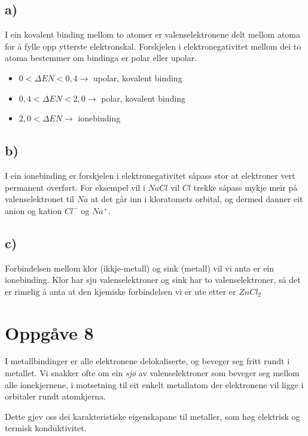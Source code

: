 \documentclass[12pt,a4paper]{article}
\begin{document}
    \subsection*{a)}
    I ein kovalent binding mellom to atomer er valenselektronene delt mellom
    atoma for å fylle opp ytterste elektronskal. Forskjelen i
    elektronegativitet mellom dei to atoma bestemmer om bindinga er polar eller
    upolar.
    \begin{itemize}
      \item $0 < \Delta EN < 0,4 \rightarrow$ upolar, kovalent binding
      \item $0,4 < \Delta EN < 2,0 \rightarrow$ polar, kovalent binding
      \item $2,0 < \Delta EN \rightarrow$ ionebinding
    \end{itemize}

    \subsection*{b)}
    I ein ionebinding er forskjelen i elektronegativitet såpass stor at
    elektroner vert permanent overført. For eksempel vil i $NaCl$ vil $Cl$
    trekke såpass mykje meir på valenselektronet til $Na$ at det går inn i
    kloratomets orbital, og dermed danner eit anion og kation $Cl^-$ og $Na^+$.

    \subsection*{c)}
    Forbindelsen mellom klor (ikkje-metall) og sink (metall) vil vi anta er ein ionebinding.
    Klor har sju valenselektroner og sink har to valenselektroner, så det er rimelig å
    anta at den kjemiske forbindelsen vi er ute etter er $ZnCl_2$


  \section*{Oppgåve 8}
    I metallbindinger er alle elektronene delokaliserte, og beveger seg fritt rundt i metallet.
    Vi snakker ofte om ein \textit{sjø} av valenselektroner som beveger seg mellom
    alle ionekjernene, i motsetning til eit enkelt metallatom der elektronene vil ligge i
    orbitaler rundt atomkjerna.
    \bigskip

    Dette gjev oss dei karakteristiske eigenskapane til metaller, som høg elektrisk og
    termisk konduktivitet.

  \newpage
\end{document}

